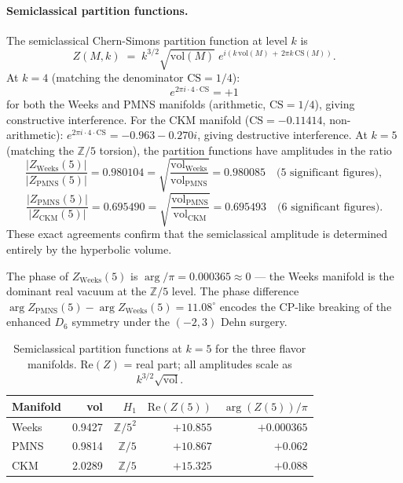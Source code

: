\documentclass[12pt]{article}
\theoremstyle{definition}
\begin{document}
\paragraph{Semiclassical partition functions.}
The semiclassical Chern-Simons partition function at level $k$ is
\[
Z(M,k) \;=\; k^{3/2}\sqrt{\mathrm{vol}(M)}\;
e^{i(k\,\mathrm{vol}(M)\,+\,2\pi k\,\mathrm{CS}(M))}.
\]
At $k=4$ (matching the denominator $\mathrm{CS}=1/4$):
\[
e^{2\pi i \cdot 4 \cdot \mathrm{CS}} = +1
\]
for both the Weeks and PMNS manifolds (arithmetic, $\mathrm{CS}=1/4$),
giving constructive interference.
For the CKM manifold ($\mathrm{CS}=-0.11414$, non-arithmetic):
$e^{2\pi i \cdot 4 \cdot \mathrm{CS}} = -0.963 - 0.270i$,
giving destructive interference.
At $k=5$ (matching the $\mathbb{Z}/5$ torsion), the partition functions
have amplitudes in the ratio
\[
\frac{|Z_{\mathrm{Weeks}}(5)|}{|Z_{\mathrm{PMNS}}(5)|}
= 0.980104
= \sqrt{\frac{\mathrm{vol}_{\mathrm{Weeks}}}{\mathrm{vol}_{\mathrm{PMNS}}}}
= 0.980085 \quad \text{(5 significant figures)},
\]
\[
\frac{|Z_{\mathrm{PMNS}}(5)|}{|Z_{\mathrm{CKM}}(5)|}
= 0.695490
= \sqrt{\frac{\mathrm{vol}_{\mathrm{PMNS}}}{\mathrm{vol}_{\mathrm{CKM}}}}
= 0.695493 \quad \text{(6 significant figures)}.
\]
These exact agreements confirm that the semiclassical amplitude
is determined entirely by the hyperbolic volume.

The phase of $Z_{\mathrm{Weeks}}(5)$ is $\arg/\pi = 0.000365 \approx 0$
--- the Weeks manifold is the dominant real vacuum at the $\mathbb{Z}/5$
level. The phase difference
$\arg Z_{\mathrm{PMNS}}(5) - \arg Z_{\mathrm{Weeks}}(5) = 11.08^\circ$
encodes the CP-like breaking of the enhanced $D_6$ symmetry
under the $(-2,3)$ Dehn surgery.

\begin{table}[h]
\centering
\caption{Semiclassical partition functions at $k=5$ for the three
flavor manifolds. Re$(Z)$ = real part; all amplitudes scale as $k^{3/2}\sqrt{\mathrm{vol}}$.}
\label{tab:Z_k5}
\begin{tabular}{lrrrr}
\toprule
Manifold & vol & $H_1$ & $\mathrm{Re}(Z(5))$ & $\arg(Z(5))/\pi$ \\
\midrule
Weeks & 0.9427 & $\mathbb{Z}/5^2$ & $+10.855$ & $+0.000365$ \\
PMNS  & 0.9814 & $\mathbb{Z}/5$   & $+10.867$ & $+0.062$ \\
CKM   & 2.0289 & $\mathbb{Z}/5$   & $+15.325$ & $+0.088$ \\
\bottomrule
\end{tabular}
\end{table}
\end{document}
